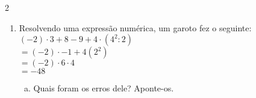 \documentclass[a4paper,14pt]{article}
\begin{document}
\begin{multicols}{2}
\begin{enumerate}
\begin{enumerate}[a)]
				\item $3 -16 + 5 \cdot 5 - 5 + 4 - 4 \cdot 4$ \\\\\\\\\\\\
				\item $(3 - 7) \cdot 4 + 9 \cdot 2 - 5$ \\\\\\\\\\\\
				\item $3 - 7 \cdot 4 + 9 \cdot 2 - 5$ \\\\\\\\\\\\
				\item $((3 - 7) \cdot 4 + 9)(2 - 5)$ \\\\\\\\\\\\
				\item $(2 \cdot 8 - 12)(-6) + 4(-5)$ \\\\\\\\\\\\\\
				\item $(4 + 3(-6)+7(-2)) \cdot 3$ \\\\
			\end{enumerate}
			\item Resolvendo uma expressão numérica, um garoto fez o seguinte: \\
			$(-2) \cdot 3 + 8 - 9 + 4 \cdot (4^2 : 2)$ \\
			$=(-2) \cdot - 1 + 4(2^2)$ \\
			$=(-2) \cdot 6 \cdot 4$ \\
			$=-48$
			\begin{enumerate}[a)]
				\item Quais foram os erros dele? Aponte-os. \\\\\\\\\\

\end{enumerate}
\end{enumerate}
\end{multicols}
\end{document}
